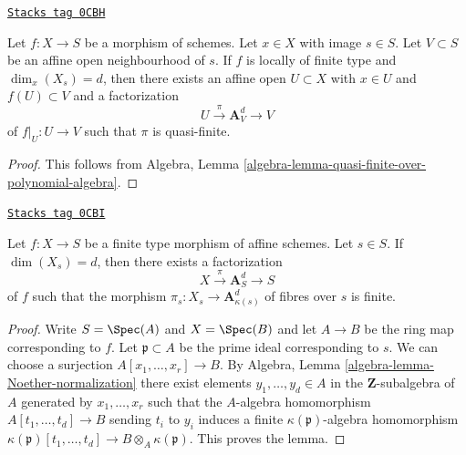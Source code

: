\begin{lemma}
\label{varieties-lemma-noether-normalization}
\href{https://stacks.math.columbia.edu/tag/0CBH}{\texttt{Stacks tag 0CBH}}

Let $f : X \to S$ be a morphism of schemes. Let $x \in X$ with
image $s \in S$. Let $V \subset S$ be an affine open neighbourhood
of $s$. If $f$ is locally of finite type and $\dim_x(X_s) = d$,
then there exists an affine open $U \subset X$ with
$x \in U$ and $f(U) \subset V$ and a factorization
$$
U \xrightarrow{\pi} \mathbf{A}^d_V \to V
$$
of $f|_U : U \to V$ such that $\pi$ is quasi-finite.
\end{lemma}

\begin{proof}
This follows from
Algebra, Lemma \ref{algebra-lemma-quasi-finite-over-polynomial-algebra}.
\end{proof}

\begin{lemma}
\label{varieties-lemma-noether-normalization-affine}
\href{https://stacks.math.columbia.edu/tag/0CBI}{\texttt{Stacks tag 0CBI}}

Let $f : X \to S$ be a finite type morphism of affine schemes.
Let $s \in S$. If $\dim(X_s) = d$, then there exists a factorization
$$
X \xrightarrow{\pi} \mathbf{A}^d_S \to S
$$
of $f$ such that the morphism $\pi_s : X_s \to \mathbf{A}^d_{\kappa(s)}$
of fibres over $s$ is finite.
\end{lemma}

\begin{proof}
Write $S = \Spec(A)$ and $X = \Spec(B)$ and let $A \to B$ be the ring
map corresponding to $f$. Let $\mathfrak p \subset A$ be the prime ideal
corresponding to $s$. We can choose a surjection
$A[x_1, \ldots, x_r] \to B$. By
Algebra, Lemma \ref{algebra-lemma-Noether-normalization}
there exist elements $y_1, \ldots, y_d \in A$ in the $\mathbf{Z}$-subalgebra
of $A$ generated by $x_1, \ldots, x_r$ such that the $A$-algebra homomorphism
$A[t_1, \ldots, t_d] \to B$ sending $t_i$ to $y_i$ induces a finite
$\kappa(\mathfrak p)$-algebra homomorphism
$\kappa(\mathfrak p)[t_1, \ldots, t_d] \to B \otimes_A \kappa(\mathfrak p)$.
This proves the lemma.
\end{proof}

